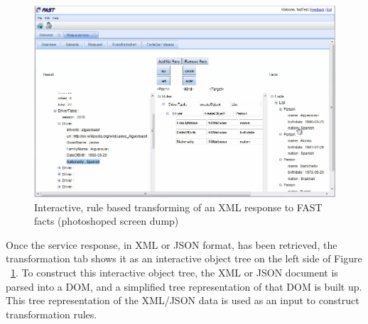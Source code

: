\documentclass{article}
\begin{document}
\begin{figure}
  \begin{center}
      \includegraphics[angle=90,width=0.8\linewidth]{images/ServiceWrapperToolGVSWithTransformationRulesF1.png}
    \caption{Interactive, rule based transforming of an XML response to FAST facts (photoshoped screen dump)}
    \label{fig:response_service_execution}
  \end{center}
\end{figure}

Once the service response, in XML or JSON format, has been retrieved, the transformation tab shows it as an interactive object tree on the left side of Figure ~\ref{fig:response_service_execution}. To construct this interactive object tree, the XML or JSON document is parsed into a DOM, and a simplified tree representation of that DOM is built up. This tree representation of the XML/JSON data is used as an input to construct transformation rules.
\end{document}
